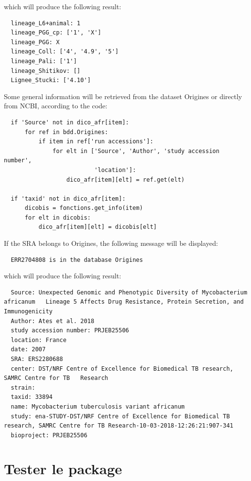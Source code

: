 \documentclass[twoside,a4paper,11pt,frenchb,openany]{report}
\begin{document}
    which will produce the following result:

    \begin{verbatim}
  lineage_L6+animal: 1
  lineage_PGG_cp: ['1', 'X']
  lineage_PGG: X
  lineage_Coll: ['4', '4.9', '5']
  lineage_Pali: ['1']
  lineage_Shitikov: []
  Lignee_Stucki: ['4.10']
\end{verbatim}

    Some general information will be retrieved from the dataset Origines or
directly from NCBI, according to the code:

\begin{verbatim}
  if 'Source' not in dico_afr[item]:
      for ref in bdd.Origines:
          if item in ref['run accessions']:
              for elt in ['Source', 'Author', 'study accession number',
                          'location']:
                  dico_afr[item][elt] = ref.get(elt)

  if 'taxid' not in dico_afr[item]:
      dicobis = fonctions.get_info(item)
      for elt in dicobis:
          dico_afr[item][elt] = dicobis[elt]
\end{verbatim}

    If the SRA belongs to Origines, the following message will be displayed:

    \begin{verbatim}
  ERR2704808 is in the database Origines
\end{verbatim}

    which will produce the following result:

    \begin{verbatim}
  Source: Unexpected Genomic and Phenotypic Diversity of Mycobacterium africanum   Lineage 5 Affects Drug Resistance, Protein Secretion, and Immunogenicity
  Author: Ates et al. 2018
  study accession number: PRJEB25506
  location: France
  date: 2007
  SRA: ERS2280688
  center: DST/NRF Centre of Excellence for Biomedical TB research, SAMRC Centre for TB   Research
  strain: 
  taxid: 33894
  name: Mycobacterium tuberculosis variant africanum
  study: ena-STUDY-DST/NRF Centre of Excellence for Biomedical TB research, SAMRC Centre for TB Research-10-03-2018-12:26:21:907-341
  bioproject: PRJEB25506
\end{verbatim}





\chapter{Tester le package}
\end{document}
